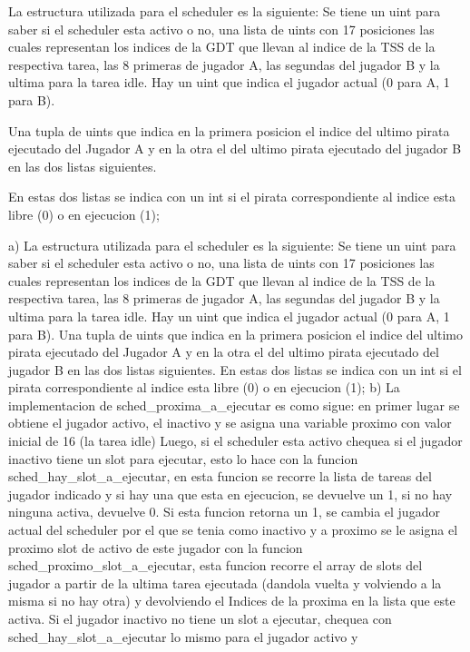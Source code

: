 La estructura utilizada para el scheduler es la siguiente:
  Se tiene un uint para saber si el scheduler esta activo o no, una lista de uints con 17 posiciones las cuales
  representan los indices de la GDT que llevan al indice de la TSS de la respectiva tarea, las 8 primeras de jugador A,
  las segundas del jugador B y la ultima para la tarea idle.
  Hay un uint que indica el jugador actual (0 para A, 1 para B).

Una tupla de uints que indica en la primera posicion el indice del ultimo pirata ejecutado del Jugador A y en la otra el del
ultimo pirata ejecutado del jugador B en las dos listas siguientes.

En estas dos listas se indica con un int si el pirata correspondiente al indice esta libre (0) o en ejecucion (1);

a) La estructura utilizada para el scheduler es la siguiente:
  Se tiene un uint para saber si el scheduler esta activo o no, una lista de uints con 17 posiciones las cuales
  representan los indices de la GDT que llevan al indice de la TSS de la respectiva tarea, las 8 primeras de jugador A,
  las segundas del jugador B y la ultima para la tarea idle.
  Hay un uint que indica el jugador actual (0 para A, 1 para B).
  Una tupla de uints que indica en la primera posicion el indice del ultimo pirata ejecutado del Jugador A y en la otra el del
  ultimo pirata ejecutado del jugador B en las dos listas siguientes.
  En estas dos listas se indica con un int si el pirata correspondiente al indice esta libre (0) o en ejecucion (1);
b) La implementacion de sched_proxima_a_ejecutar es como sigue:
  en primer lugar se obtiene el jugador activo, el inactivo y se asigna una variable proximo con valor inicial de 16 (la tarea idle)
  Luego, si el scheduler esta activo chequea si el jugador inactivo tiene un slot para ejecutar, esto lo hace con la
  funcion sched_hay_slot_a_ejecutar, en esta funcion se recorre la lista de tareas del jugador indicado y si hay una que esta
  en ejecucion, se devuelve un 1, si no hay ninguna activa, devuelve 0.
  Si esta funcion retorna un 1, se cambia el jugador actual del scheduler por el que se tenia como inactivo y a proximo se le asigna
  el proximo slot de activo de este jugador con la funcion sched_proximo_slot_a_ejecutar, esta funcion recorre el array de slots
  del jugador a partir de la ultima tarea ejecutada (dandola vuelta y volviendo a la misma si no hay otra) y devolviendo el Indices
  de la proxima en la lista que este activa.
  Si el jugador inactivo no tiene un slot a ejecutar, chequea con sched_hay_slot_a_ejecutar lo mismo para el jugador activo y
